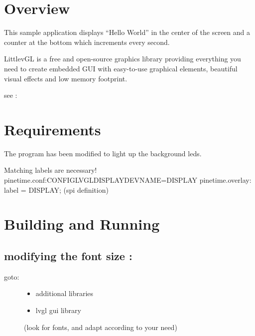 \documentclass[letterpaper,10pt,english]{sphinxmanual}
\begin{document}
\section{Overview}
\label{\detokenize{lvgl:overview}}
This sample application displays “Hello World” in the center of the screen
and a counter at the bottom which increments every second.

LittlevGL is a free and open-source graphics library providing everything you need to create embedded GUI with easy-to-use graphical elements, beautiful visual effects and low memory footprint.

see : 


\section{Requirements}
\label{\detokenize{lvgl:requirements}}
The program has been modified to light up the background leds.


\begin{sphinxVerbatim}[commandchars=\\\{\}]
Matching labels are necessary!
pinetime.conf:CONFIG\PYGZus{}LVGL\PYGZus{}DISPLAY\PYGZus{}DEV\PYGZus{}NAME=\PYGZdq{}DISPLAY\PYGZdq{}
pinetime.overlay:               label = \PYGZdq{}DISPLAY\PYGZdq{}; (spi definition)
\end{sphinxVerbatim}


\section{Building and Running}
\label{\detokenize{lvgl:building-and-running}}
\begin{sphinxVerbatim}[commandchars=\\\{\}]
\end{sphinxVerbatim}


\subsection{modifying the font size :}
\label{\detokenize{lvgl:modifying-the-font-size}}
\begin{sphinxVerbatim}[commandchars=\\\{\}]
\end{sphinxVerbatim}
\begin{description}
\item[{goto:}] \leavevmode\begin{itemize}
\item {} 
additional libraries

\item {} 
lvgl gui library

\end{itemize}

(look for fonts, and adapt according to your need)

\end{description}
\end{document}
